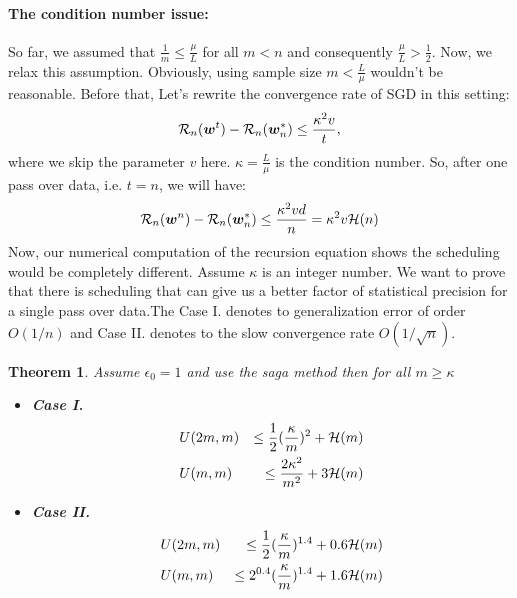 \documentclass{article}
\newtheorem{theorem}{Theorem}
\newcommand{\wv}{\bm{w}}
\newcommand{\risk}{{\cal R}}
\newcommand{\bound}{{\cal H}}
\begin{document}
\paragraph{The condition number issue:}
So far, we assumed that $\frac{1}{m} \leq \frac{\mu}{L}$ for all $m<n$ and
consequently $\frac{\mu}{L}>\frac{1}{2}$. Now, we relax this assumption.
Obviously, using sample size $m<\frac{L}{\mu}$ wouldn't be reasonable. Before
that, Let's rewrite the convergence rate of SGD in this setting:
\begin{equation*}
	\risk_n(\wv^t) - \risk_n(\wv^*_n) \leq \frac{\kappa^2 v  }{t}, 
\end{equation*}
where we skip the parameter $v$ here. $\kappa = \frac{L}{\mu}$ is the condition
number. So, after one pass over data, i.e. $t = n$, we
will have:
\begin{equation*}
	\risk_n(\wv^n) - \risk_n(\wv^*_n) \leq \frac{\kappa^2 v d }{n} = \kappa^2 v
	\bound(n)
\end{equation*}
Now, our numerical computation of the recursion equation shows the
scheduling would be completely different. Assume $\kappa$ is an integer number. 
We want to prove that there is scheduling that can give us a better factor of
statistical precision for a single pass over data.The Case I. denotes to
generalization error of order $O(1/n)$ and Case II. denotes to the slow
convergence rate $O(1/\sqrt{n})$.
\begin{theorem}
	Assume $\epsilon_0 = 1$ and use the saga method then for all $m \geq \kappa$ \\
	\begin{itemize}
	  \item \textbf{Case I.}
	  \begin{eqnarray*}
		& U(2 m, m ) & \leq \frac{1}{2} (\frac{\kappa}{m})^2 + \bound(m)  \\ 
		& U(m,m) &  \leq \frac{2\kappa^2}{m^2} + 3 \bound(m)
	\end{eqnarray*}
	\item  \textbf{Case II.}
	  \begin{eqnarray*}
		& U(2 m, m ) & \leq \frac{1}{2}(\frac{\kappa}{m})^{1.4} + 0.6 \bound(m)
		\\
		& U(m,m) & \leq 2^{0.4} (\frac{\kappa}{m})^{1.4} + 1.6 \bound(m)
	\end{eqnarray*}
	\end{itemize}
\end{theorem}
\end{document}
